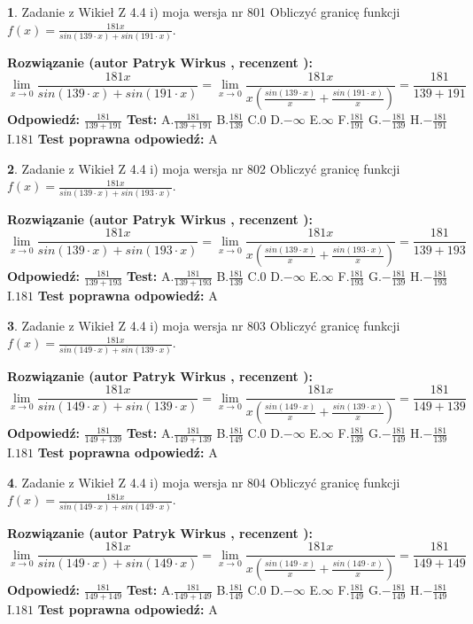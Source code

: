 \documentclass[12pt, a4paper]{article}
\theoremstyle{definition} %
\newtheorem{zad}{}
\newcommand{\zadStart}[1]{\begin{zad}#1\newline}
\newcommand{\zadStop}{\end{zad}}
\newcommand{\rozwStart}[2]{\noindent \textbf{Rozwiązanie (autor #1 , recenzent #2): }\newline}
\newcommand{\rozwStop}{\newline}
\newcommand{\odpStart}{\noindent \textbf{Odpowiedź:}\newline}
\newcommand{\odpStop}{\newline}
\newcommand{\testStart}{\noindent \textbf{Test:}\newline}
\newcommand{\testStop}{\newline}
\newcommand{\kluczStart}{\noindent \textbf{Test poprawna odpowiedź:}\newline}
\newcommand{\kluczStop}{\newline}
\begin{document}
\zadStart{Zadanie z Wikieł Z 4.4 i) moja wersja nr 801}
Obliczyć granicę funkcji $f(x)=\frac{181x}{sin(139\cdot x) +sin(191\cdot x)}$.
\zadStop
\rozwStart{Patryk Wirkus}{}
$$\lim\limits_{x\to 0}\frac{181x}{sin(139\cdot x) +sin(191\cdot x)}=\lim\limits_{x\to 0}\frac{181x}{x(\frac{sin(139\cdot x)}{x}+\frac{sin(191\cdot x)}{x})}=\frac{181}{139+191}$$
\rozwStop
\odpStart
$\frac{181}{139+191}$
\odpStop
\testStart
A.$\frac{181}{139+191}$
B.$\frac{181}{139}$
C.$0$
D.$-\infty$
E.$\infty$
F.$\frac{181}{191}$
G.$-\frac{181}{139}$
H.$-\frac{181}{191}$
I.$181$
\testStop
\kluczStart
A
\kluczStop



\zadStart{Zadanie z Wikieł Z 4.4 i) moja wersja nr 802}
Obliczyć granicę funkcji $f(x)=\frac{181x}{sin(139\cdot x) +sin(193\cdot x)}$.
\zadStop
\rozwStart{Patryk Wirkus}{}
$$\lim\limits_{x\to 0}\frac{181x}{sin(139\cdot x) +sin(193\cdot x)}=\lim\limits_{x\to 0}\frac{181x}{x(\frac{sin(139\cdot x)}{x}+\frac{sin(193\cdot x)}{x})}=\frac{181}{139+193}$$
\rozwStop
\odpStart
$\frac{181}{139+193}$
\odpStop
\testStart
A.$\frac{181}{139+193}$
B.$\frac{181}{139}$
C.$0$
D.$-\infty$
E.$\infty$
F.$\frac{181}{193}$
G.$-\frac{181}{139}$
H.$-\frac{181}{193}$
I.$181$
\testStop
\kluczStart
A
\kluczStop



\zadStart{Zadanie z Wikieł Z 4.4 i) moja wersja nr 803}
Obliczyć granicę funkcji $f(x)=\frac{181x}{sin(149\cdot x) +sin(139\cdot x)}$.
\zadStop
\rozwStart{Patryk Wirkus}{}
$$\lim\limits_{x\to 0}\frac{181x}{sin(149\cdot x) +sin(139\cdot x)}=\lim\limits_{x\to 0}\frac{181x}{x(\frac{sin(149\cdot x)}{x}+\frac{sin(139\cdot x)}{x})}=\frac{181}{149+139}$$
\rozwStop
\odpStart
$\frac{181}{149+139}$
\odpStop
\testStart
A.$\frac{181}{149+139}$
B.$\frac{181}{149}$
C.$0$
D.$-\infty$
E.$\infty$
F.$\frac{181}{139}$
G.$-\frac{181}{149}$
H.$-\frac{181}{139}$
I.$181$
\testStop
\kluczStart
A
\kluczStop



\zadStart{Zadanie z Wikieł Z 4.4 i) moja wersja nr 804}
Obliczyć granicę funkcji $f(x)=\frac{181x}{sin(149\cdot x) +sin(149\cdot x)}$.
\zadStop
\rozwStart{Patryk Wirkus}{}
$$\lim\limits_{x\to 0}\frac{181x}{sin(149\cdot x) +sin(149\cdot x)}=\lim\limits_{x\to 0}\frac{181x}{x(\frac{sin(149\cdot x)}{x}+\frac{sin(149\cdot x)}{x})}=\frac{181}{149+149}$$
\rozwStop
\odpStart
$\frac{181}{149+149}$
\odpStop
\testStart
A.$\frac{181}{149+149}$
B.$\frac{181}{149}$
C.$0$
D.$-\infty$
E.$\infty$
F.$\frac{181}{149}$
G.$-\frac{181}{149}$
H.$-\frac{181}{149}$
I.$181$
\testStop
\kluczStart
A
\kluczStop
\end{document}
